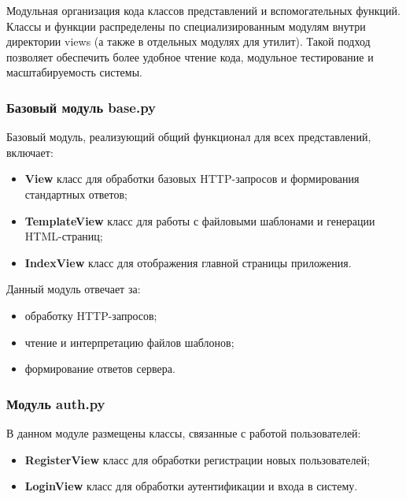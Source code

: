 Модульная организация кода классов представлений и вспомогательных функций. Классы и функции распределены по специализированным модулям внутри директории views (а также в отдельных модулях для утилит). Такой подход позволяет обеспечить более удобное чтение кода, модульное тестирование и масштабируемость системы.

\subsubsection{Базовый модуль base.py} 
Базовый модуль, реализующий общий функционал для всех представлений, включает:
\begin{itemize}
	\item \textbf{View} класс для обработки базовых HTTP-запросов и формирования стандартных ответов;
	\item \textbf{TemplateView} класс для работы с файловыми шаблонами и генерации HTML-страниц;
	\item \textbf{IndexView} класс для отображения главной страницы приложения.
\end{itemize}

Данный модуль отвечает за:

\begin{itemize}
	\item обработку HTTP-запросов;
	\item чтение и интерпретацию файлов шаблонов;
	\item формирование ответов сервера.
\end{itemize}

\subsubsection{Модуль auth.py}
В данном модуле размещены классы, связанные с работой пользователей:
\begin{itemize}
	\item \textbf{RegisterView} класс для обработки регистрации новых пользователей;
	\item \textbf{LoginView} класс для обработки аутентификации и входа в систему.
\end{itemize}

